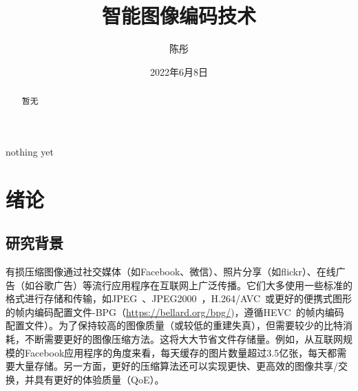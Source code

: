 \documentclass[macfonts,phd,oneside,nobackinfo]{njuthesis}
\title{智能图像编码技术}
\author{陈彤}
\institute{南京大学}
\date{2022年6月8日}
\begin{document}

\makenlctitle
\maketitle
\makeenglishtitle


\frontmatter

\begin{abstract}
暂无

\end{abstract}

\begin{englishabstract}
nothing yet

\end{englishabstract}



\tableofcontents



\mainmatter

\chapter{绪论}\label{chapter_introduction}
\section{研究背景}
有损压缩图像通过社交媒体（如Facebook、微信）、照片分享（如flickr）、在线广告（如谷歌广告）等流行应用程序在互联网上广泛传播。它们大多使用一些标准的格式进行存储和传输，如JPEG~\cite{wallace1991jpeg}、JPEG2000~\cite{JPEG2K}，H.264/AVC~\cite{AVC}或更好的便携式图形的帧内编码配置文件-BPG（\url{https://bellard.org/bpg/})，遵循HEVC~\cite{HEVC}的帧内编码配置文件）。为了保持较高的图像质量（或较低的重建失真），但需要较少的比特消耗，不断需要更好的图像压缩方法。这将大大节省文件存储量。例如，从互联网规模的Facebook应用程序的角度来看，每天缓存的图片数量超过3.5亿张，每天都需要大量存储。另一方面，更好的压缩算法还可以实现更快、更高效的图像共享/交换，并具有更好的体验质量（QoE）。
\end{document}
